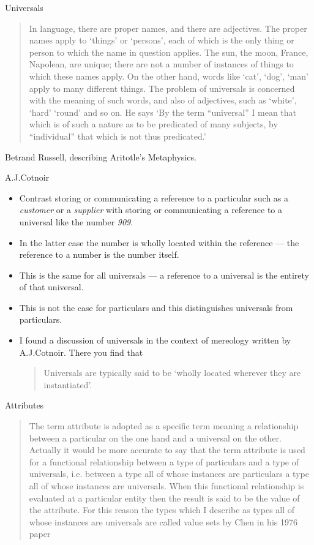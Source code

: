 
\begin{frame}{Universals}
\begin{quote}
In language, there are proper names, and there are adjectives. 
The proper names apply to `things' or `persons', each of which is the only thing or person
to  which the name in question applies. The sun, the moon, France, Napolean, are unique; there are not a number of instances of things to which these names apply. On the other hand, words like `cat', `dog', `man' apply to many different things. 
The problem of universals is concerned with the meaning of such words, and also of adjectives, such as `white', `hard' `round' and so on.
He says `By the term ``universal'' I mean that which is of such a nature as to be predicated of many subjects, by ``individual'' that which is not thus predicated.'  
\end{quote} Betrand Russell, describing Aritotle's Metaphysics.
\end{frame}

\begin{frame}{A.J.Cotnoir}
\begin{itemize}
\item Contrast storing or communicating a reference to a particular such as a 
\textit{customer} or a \textit{supplier}
with storing or communicating a reference to a universal like the number \textit{909}. 
\item In the latter case the number is wholly located within the reference
--- the reference to a number is the number itself.
\item This is the same for all universals --- a reference to a universal is the entirety of that universal.
\item This is not the case for particulars and this distinguishes universals from particulars.
\item I found a discussion of universals in the context of mereology
written by A.J.Cotnoir. There you find that 
\begin{quote}
Universals are typically said to be ‘wholly located wherever they
are instantiated’.
\end{quote}
\end{itemize}
\end{frame}

\begin{frame}{Attributes}
\begin{quote}
The term attribute is
adopted as a specific term meaning a relationship between a particular on the
one hand and a universal on the other. Actually it would be more accurate
to say that the term attribute is used for a functional relationship between a
type of particulars and a type of universals, i.e. between a type all of whose
instances are particulars a type all of whose instances are universals. When this
functional relationship is evaluated at a particular entity then the result is said
to be the value of the attribute. For this reason the types which I describe as
types all of whose instances are universals are called value sets by Chen in his
1976 paper
\end{quote}
\end{frame}

